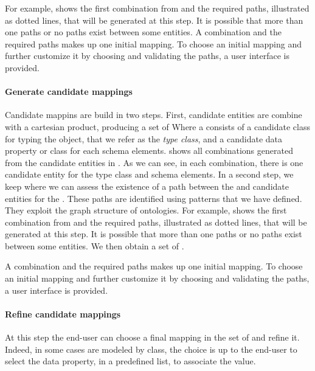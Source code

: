 For example,  shows the first combination from  and the required paths, illustrated as dotted lines, that will be generated at this step. It is possible that more than one paths or no paths exist between some entities. A combination and the required paths makes up one initial mapping. To choose an initial mapping and further customize it by choosing and validating the paths, a user interface is provided.

\paragraph{Generate candidate mappings}
Candidate mappins are build in two steps.
First, candidate entities are combine with a cartesian product, producing a set of 
Where a  consists of a candidate class for typing the object, that we refer as the \emph{type class}, and a candidate data property or class for each schema elements.
 shows all combinations generated from the candidate entities in . As we can see, in each combination, there is one candidate entity for the type class and schema elements.
In a second step, we keep  where we can assess the existence of a path between the  and candidate entities for the . These paths are identified using patterns that we have defined. They exploit the graph structure of ontologies. 
For example,  shows the first combination from  and the required paths, illustrated as dotted lines, that will be generated at this step. It is possible that more than one paths or no paths exist between some entities. 
We then obtain a set of .


A combination and the required paths makes up one initial mapping. To choose an initial mapping and further customize it by choosing and validating the paths, a user interface is provided.

\paragraph{Refine candidate mappings}
At this step the end-user can choose a final mapping in the set of  and refine it. Indeed, in some cases  are modeled by class, the choice is up to the end-user to select the data property, in a predefined list, to associate the value.

